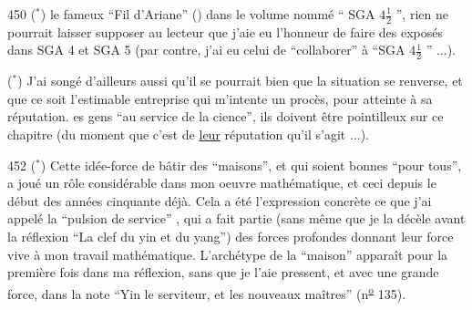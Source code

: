 450 \quad ($^{\ast}$)   le fameux ``Fil d'Ariane'' () dans le volume nommé `` SGA $4\frac12$ '',  rien ne pourrait laisser supposer au lecteur que j'aie eu l'honneur de faire des exposés dans SGA 4 et SGA 5 (par contre, j'ai  eu celui de ``collaborer'' à ``SGA $4\frac12$ '' ...). 

 \quad ($^{\ast}$) J'ai songé d'ailleurs aussi qu'il se pourrait bien que la situation se renverse, et que ce soit l'estimable entreprise qui m'intente un procès, pour atteinte à sa réputation.  es gens ``au service de la cience'', ils doivent être pointilleux sur ce chapitre  (du moment que c'est de \uline{leur}  réputation qu'il s'agit ...).

452 \quad ($^{\ast}$) Cette idée-force de bâtir des ``maisons'', et qui soient bonnes ``pour tous'', a joué un rôle considérable dans mon oeuvre mathématique, et ceci depuis le début des années cinquante déjà. Cela a été l'expression concrète   ce que j'ai appelé la ``pulsion de service'' , qui a fait partie (sans même que je la décèle avant la réflexion ``La clef du yin et du yang'') des  forces profondes donnant leur force vive à mon travail mathématique. L'archétype de la ``maison'' apparaît pour la première fois dans ma réflexion,  sans que je  l'aie  pressent, et avec une grande force, dans la note  ``Yin le serviteur, et les nouveaux maîtres'' (n\textsuperscript{\uline{o}} 135).
